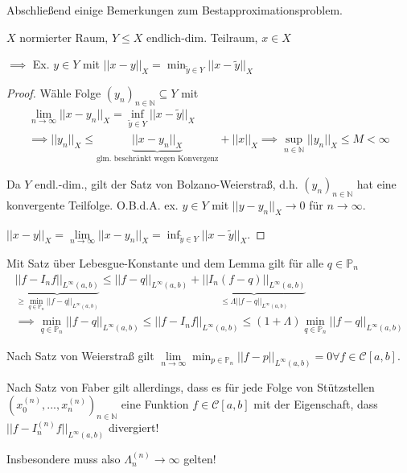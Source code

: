 Abschließend einige Bemerkungen zum Bestapproximationsproblem.

\begin{lemma}
	$X$ normierter Raum, $Y \leq X$ endlich-dim. Teilraum, $x\in X$
	
	$\implies$ Ex. $y \in Y$ mit $||x-y||_X = \min_{\tilde{y} \in Y} ||x-\tilde{y}||_X$
\end{lemma}

\begin{proof}
	Wähle Folge $(y_n)_{n\in \mathbb{N}} \subseteq Y$ mit
	\begin{align*}
		\lim\limits_{n\rightarrow\infty} ||x-y_n||_X = \inf_{\tilde{y} \in Y} ||x-\tilde{y}||_X\\
		\implies ||y_n||_X \leq \underbrace{||x-y_n||_X}_{\text{glm. beschränkt wegen Konvergenz}} + ||x||_X \implies \sup_{n\in \mathbb{N}} ||y_n||_X \leq M < \infty
	\end{align*}
	
	Da $Y$ endl.-dim., gilt der Satz von Bolzano-Weierstraß, d.h. $(y_n)_{n\in \mathbb{N}}$ hat eine konvergente Teilfolge. O.B.d.A. ex. $y \in Y$ mit $||y-y_n||_X \rightarrow 0$ für $n \rightarrow \infty$.
	
	$||x-y||_X = \lim\limits_{n\rightarrow\infty} ||x-y_n||_X = \inf_{\tilde{y} \in Y} ||x-\tilde{y}||_X$.
\end{proof}

\begin{remark}
	Mit Satz über Lebesgue-Konstante und dem Lemma gilt für alle $q \in \mathbb{P}_n$
	\begin{align*}
		\underbrace{||f-I_nf||_{L^\infty(a,b)}}_{\geq \min_{q \in \mathbb{P}_n} ||f-q||_{L^\infty(a,b)}} \leq ||f-q||_{L^\infty(a,b)} + \underbrace{||I_n(f-q)||_{L^\infty(a,b)}}_{\leq \Lambda ||f-q||_{L^\infty(a,b)}}\\
		\implies \min_{q \in \mathbb{P}_n} ||f-q||_{L^\infty(a,b)} \leq ||f-I_nf||_{L^\infty(a,b)} \leq (1+\Lambda) \min_{q \in \mathbb{P}_n} ||f-q||_{L^\infty(a,b)}
	\end{align*}
\end{remark}

\begin{remark}
	Nach Satz von Weierstraß gilt $\lim\limits_{n\rightarrow\infty} \min_{p \in \mathbb{P}_n} ||f-p||_{L^\infty(a,b)} = 0 \forall f \in \mathcal{C}[a,b]$.
	
	Nach Satz von Faber gilt allerdings, dass es für jede Folge von Stützstellen $(x_0^{(n)}, ..., x_n^{(n)})_{n\in\mathbb{N}}$ eine Funktion $f\in \mathcal{C}[a,b]$ mit der Eigenschaft, dass $||f-I_n^{(n)}f||_{L^\infty(a,b)}$ divergiert!
	
	Insbesondere muss also $\Lambda_n^{(n)} \rightarrow \infty$ gelten!
\end{remark}

